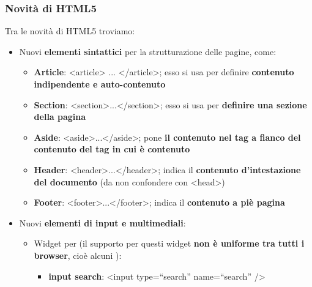 \documentclass[12pt]{article}
\begin{document}
\subsubsection{Novità di HTML5}
Tra le novità di HTML5 troviamo:
\begin{itemize}
    \item Nuovi \textbf{elementi sintattici} per la strutturazione delle pagine, come:
    \begin{itemize}
        \item \textbf{Article}: <article> ... </article>; esso si usa per definire \textbf{contenuto indipendente e auto-contenuto}
        \item \textbf{Section}: <section>...</section>; esso si usa per \textbf{definire una sezione della pagina}
        \item \textbf{Aside}: <aside>...</aside>; pone \textbf{il contenuto nel tag a fianco del contenuto del tag in cui è contenuto}
        \item \textbf{Header}: <header>...</header>; indica il \textbf{contenuto d'intestazione del documento} (da non confondere con <head>)
        \item \textbf{Footer}: <footer>...</footer>; indica il \textbf{contenuto a piè pagina}
    \end{itemize}
    \item Nuovi \textbf{elementi di input e multimediali}:
    \begin{itemize}
        \item Widget per (il supporto per questi widget \textbf{non è uniforme tra tutti i browser}, cioè alcuni ):
        \begin{itemize}
            \item \textbf{input search}: <input type=“search” name=“search” />
        \end{itemize}
    \end{itemize}
\end{itemize}
\end{document}

